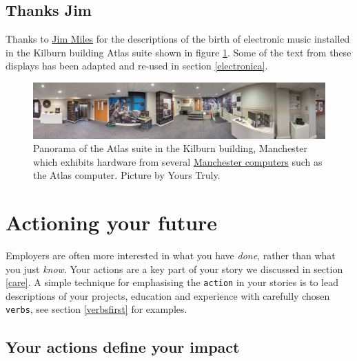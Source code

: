 \documentclass[
]{book}
\begin{document}
\hypertarget{jimusic}{%
\section{Thanks Jim}\label{jimusic}}

Thanks to \href{https://en.wikipedia.org/wiki/James_John_Miles}{Jim Miles} for the descriptions of the birth of electronic music installed in the Kilburn building Atlas suite shown in figure \ref{fig:atlassuite-fig}. Some of the text from these displays has been adapted and re-used in section \ref{electronica}. \citep{ieeemilestones}

\begin{figure}

{\centering \includegraphics[width=1\linewidth]{images/atlas-suite-kilburn-building-manchester} 

}

\caption{Panorama of the Atlas suite in the Kilburn building, Manchester which exhibits hardware from several \href{https://en.wikipedia.org/wiki/Manchester_computers}{Manchester computers} such as the Atlas computer. Picture by Yours Truly.}\label{fig:atlassuite-fig}
\end{figure}



\hypertarget{actioning}{%
\chapter{Actioning your future}\label{actioning}}

Employers are often more interested in what you have \emph{done}, rather than what you just \emph{know}. Your actions are a key part of your story we discussed in section \ref{care}. A simple technique for emphasising the \texttt{action} in your stories is to lead descriptions of your projects, education and experience with carefully chosen \texttt{verbs}, see section \ref{verbsfirst} for examples.

\hypertarget{impact}{%
\section{Your actions define your impact}\label{impact}}
\end{document}
